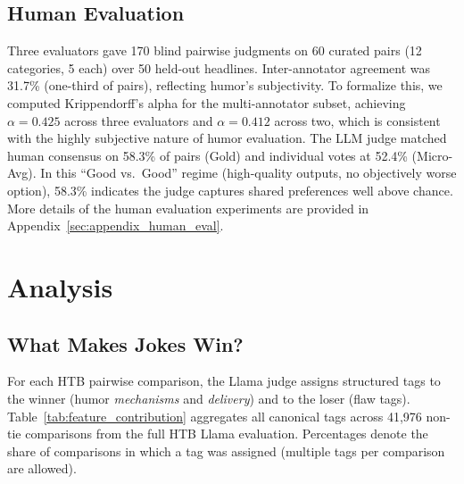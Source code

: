 \documentclass[11pt]{article}
\begin{document}
\subsection{Human Evaluation}
\label{sec:results_human_eval}

Three evaluators gave 170 blind pairwise judgments on 60 curated pairs (12 categories, 5 each) over 50 held-out headlines. Inter-annotator agreement was 31.7\% (one-third of pairs), reflecting humor's subjectivity. To formalize this, we computed Krippendorff's alpha for the multi-annotator subset, achieving $\alpha = 0.425$ across three evaluators and $\alpha = 0.412$ across two, which is consistent with the highly subjective nature of humor evaluation. The LLM judge matched human consensus on 58.3\% of pairs (Gold) and individual votes at 52.4\% (Micro-Avg). In this ``Good vs.\ Good'' regime (high-quality outputs, no objectively worse option), 58.3\% indicates the judge captures shared preferences well above chance. More details of the human evaluation experiments are provided in Appendix~\ref{sec:appendix_human_eval}.



\section{Analysis}

\subsection{What Makes Jokes Win?}
For each HTB pairwise comparison, the Llama judge assigns structured tags to the winner (humor \textit{mechanisms} and \textit{delivery}) and to the loser (flaw tags). Table~\ref{tab:feature_contribution} aggregates all canonical tags across 41,976 non-tie comparisons from the full HTB Llama evaluation. Percentages denote the share of comparisons in which a tag was assigned (multiple tags per comparison are allowed).
\end{document}
